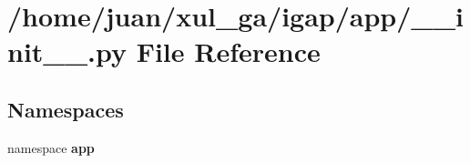 \section{/home/juan/xul\_\-ga/igap/app/\_\-\_\-init\_\-\_\-.py File Reference}
\label{app_2____init_____8py}
\subsection*{Namespaces}
\begin{CompactItemize}
\item 
namespace {\bf app}
\end{CompactItemize}
